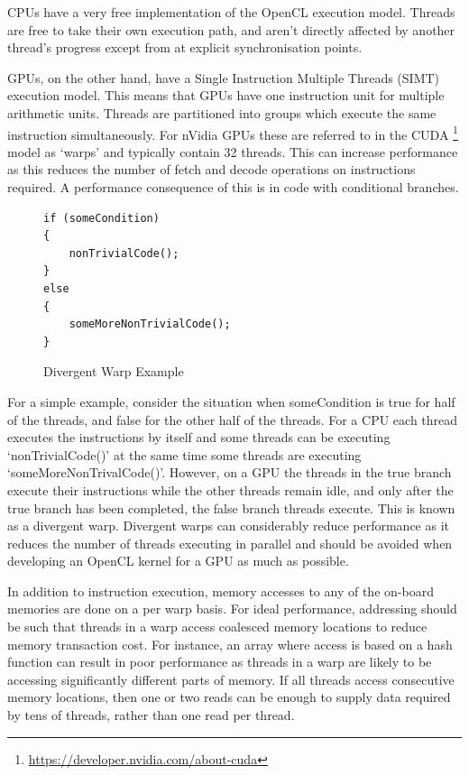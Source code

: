 CPUs have a very free implementation of the OpenCL execution model. Threads are
free to take their own execution path, and aren't directly affected by another
thread's progress except from at explicit synchronisation points.

GPUs, on the other hand, have a Single Instruction Multiple Threads (SIMT)
execution model. This means that GPUs have one instruction unit for multiple
arithmetic units. Threads are partitioned into groups which execute the same
instruction simultaneously. For nVidia GPUs these are referred to in the CUDA
\footnote{\url{https://developer.nvidia.com/about-cuda}} model as `warps' and
typically contain 32 threads. This can increase performance as this reduces the
number of fetch and decode operations on instructions required. A performance
consequence of this is in code with conditional branches.

\begin{figure}[H]
\small\begin{verbatim}
if (someCondition)
{
    nonTrivialCode();
}
else
{
    someMoreNonTrivialCode();
}
\end{verbatim}
\caption{Divergent Warp Example}
\end{figure}

For a simple example, consider the situation when someCondition is true for half
of the threads, and false for the other half of the threads. For a CPU each
thread executes the instructions by itself and some threads can be executing
`nonTrivialCode()' at the same time some threads are executing
`someMoreNonTrivalCode()'. However, on a GPU the threads in the true branch
execute their instructions while the other threads remain idle, and only after
the true branch has been completed, the false branch threads execute. This is
known as a divergent warp. Divergent warps can considerably reduce performance
as it reduces the number of threads executing in parallel and should be avoided
when developing an OpenCL kernel for a GPU as much as possible.

In addition to instruction execution, memory accesses to any of the on-board
memories are done on a per warp basis. For ideal performance, addressing should
be such that threads in a warp access coalesced memory locations to reduce
memory transaction cost. For instance, an array where access is based on a hash
function can result in poor performance as threads in a warp are likely to be
accessing significantly different parts of memory. If all threads access
consecutive memory locations, then one or two reads can be enough to supply data
required by tens of threads, rather than one read per thread.

